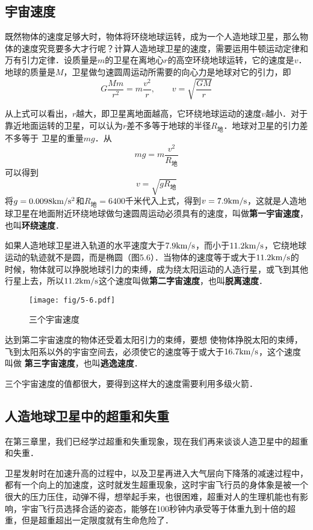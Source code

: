 \subsection{宇宙速度}

既然物体的速度足够大时，物体将环绕地球运转，成为一个人造地球卫星，那么物体的速度究竞要多大才行呢？计算人造地球卫星的速度，需要运用牛顿运动定律和万有引力定律．设质量是$m$的卫星在离地心$r$的高空环绕地球运转，它的速度是$v$．地球的质量是$M$，卫星做匀速圆周运动所需要的向心力是地球对它的引力，即
\[G\frac{Mm}{r^2}=m\frac{v^2}{r},\qquad v=\sqrt{\frac{GM}{r}} \]

从上式可以看出，$r$越大，即卫星离地面越高，它环绕地球运动的速度$v$越小．对于靠近地面运转的卫星，可以认为$r$差不多等于地球的半径$R_{\text{地}}$．地球对卫星的引力差不多等于
卫星的重量$mg$．从
\[mg=m\frac{v^2}{R_{\text{地}}} \]
可以得到
\[v=\sqrt{gR_{\text{地}}}\]
将$g=0.0098{\rm km}/{\rm s^2}$和$R_{\text{地}}=6400$千米代入上式，得到$v=7.9{\rm km}/{\rm s}$，这就是人造地球卫星在地面附近环绕地球做匀速圆周运动必须具有的速度，叫做\textbf{第一宇宙速度}，也叫\textbf{环绕速度}．

如果人造地球卫星进入轨道的水平速度大于$7.9{\rm km}/{\rm s}$，而小于$11.2{\rm km}/{\rm s}$，它绕地球运动的轨迹就不是圆，而是椭圆（图5.6）．当物体的速度等于或大于$11.2{\rm km}/{\rm s}$的
时候，物体就可以挣脱地球引力的束缚，成为绕太阳运动的人造行星，或飞到其他行星上去，所以$11.2{\rm km}/{\rm s}$这个速度叫做\textbf{第二字宙速度}，也叫\textbf{脱离速度}．
\begin{figure}\centering
\texttt{[image: fig/5-6.pdf]}
\caption{三个宇宙速度}
\end{figure}

达到第二宇宙速度的物体还受着太阳引力的束缚，要想
使物体挣脱太阳的束缚，飞到太阳系以外的宇宙空间去，必须使它的速度等于或大于$16.7{\rm km}/{\rm s}$，这个速度叫做 \textbf{第三字宙速度}，也叫\textbf{逃逸速度}．

三个宇宙速度的值都很大，要得到这样大的速度需要利用多级火箭．

\subsection{人造地球卫星中的超重和失重}

在第三章里，我们已经学过超重和失重现象，现在我们再来谈谈人造卫星中的超重和失重．

卫星发射时在加速升高的过程中，以及卫星再进入大气层向下降落的减速过程中，都有一个向上的加速度，这时就发生超重现象，这时宇宙飞行员的身体象是被一个很大的压力压住，动弹不得，想举起手来，也很困难，超重对人的生理机能也有影响，宇宙飞行员选择合适的姿态，能够在100秒钟内承受等于体重九到十倍的超重，但是超重超出一定限度就有生命危险了．

